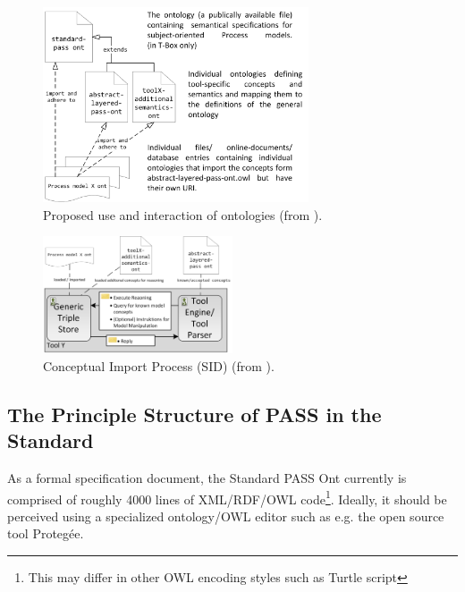 
\begin{figure}[ht]
	\centering
	\includegraphics[width=0.7\textwidth]{Figures/Ontology/Introduction/ont-and-models.png}
	\caption{Proposed use and interaction of ontologies (from \cite{elster:ont} ).}
	\label{fig:ontAndModel}
\end{figure}

\begin{figure}[ht]
	\centering
	\includegraphics[width=0.50\textwidth]{Figures/Ontology/Introduction/importWorkflow.png}
	\caption{Conceptual Import Process (SID) (from \cite{elster:ont}). }
	\label{fig:ImportOnt}
\end{figure}



\subsection{The Principle Structure of PASS in the Standard }

As a formal specification document, the Standard PASS Ont currently is comprised of roughly 4000 lines of XML/RDF/OWL code\footnote{This may differ in other OWL encoding styles such as Turtle script}. Ideally, it should be perceived using a specialized ontology/OWL editor such as e.g. the open source tool Protegée. 

